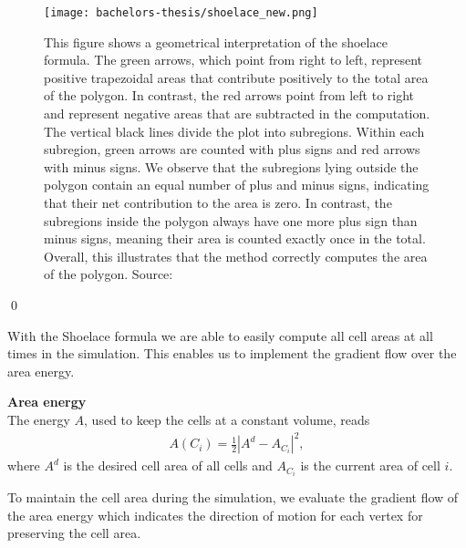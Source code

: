 \begin{proposition}
	\begin{figure}
		\begin{center}
			\texttt{[image: bachelors-thesis/shoelace\_new.png]}
			\caption{
				This figure shows a geometrical interpretation of the shoelace formula.
				The green arrows, which point from right to left, represent positive trapezoidal areas that contribute positively to the total area of the polygon.
				In contrast, the red arrows point from left to right and represent negative areas that are subtracted in the computation.
				The vertical black lines divide the plot into subregions.
				Within each subregion, green arrows are counted with plus signs and red arrows with minus signs.
				We observe that the subregions lying outside the polygon contain an equal number of plus and minus signs, indicating that their net contribution to the area is zero.
				In contrast, the subregions inside the polygon always have one more plus sign than minus signs, meaning their area is counted exactly once in the total.
				Overall, this illustrates that the method correctly computes the area of the polygon.
				Source:~\cite{ShoelaceFigure2022}}
			\label{fig:shoelace}
		\end{center}
	\end{figure}
	\qed
\end{proposition}

With the Shoelace formula we are able to easily compute all cell areas at all times in the simulation. 
This enables us to implement the gradient flow over the area energy. 

\begin{definition} \textbf{Area energy} \\
	The energy $A$, used to keep the cells at a constant volume, reads 
	\begin{align}
		A(C_i) = \frac{1}{2} | A^d - A_{C_i}|^2, \label{eq:areaEnergy} 
	\end{align}
	where $A^d$ is the desired cell area of all cells and $A_{C_i}$ is the current area of cell $i$. 
\end{definition}

To maintain the cell area during the simulation, we evaluate the gradient flow of the area energy which indicates the direction of motion for each vertex for preserving the cell area.

